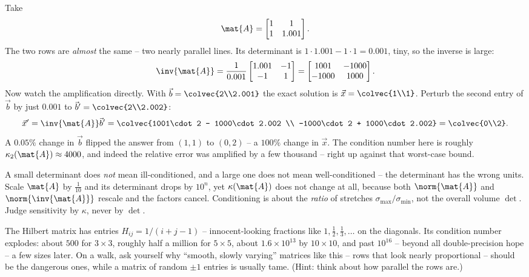 \begin{example}
\label{ch33:cond2x2}
Take
\[
  \mat{A} = \begin{bmatrix} 1 & 1 \\ 1 & 1.001 \end{bmatrix}.
\]
The two rows are \emph{almost} the same -- two nearly parallel lines. Its determinant
is $1\cdot 1.001 - 1\cdot 1 = 0.001$, tiny, so the inverse is large:
\[
  \inv{\mat{A}} = \frac{1}{0.001}\begin{bmatrix} 1.001 & -1 \\ -1 & 1 \end{bmatrix}
   = \begin{bmatrix} 1001 & -1000 \\ -1000 & 1000 \end{bmatrix}.
\]
Now watch the amplification directly. With $\vec{b}=\colvec{2\\2.001}$ the exact
solution is $\vec{x}=\colvec{1\\1}$. Perturb the second entry of $\vec{b}$ by just
$0.001$ to $\vec{b}'=\colvec{2\\2.002}$:
\[
  \vec{x}' = \inv{\mat{A}}\vec{b}' = \colvec{1001\cdot 2 - 1000\cdot 2.002 \\ -1000\cdot 2 + 1000\cdot 2.002}
   = \colvec{0\\2}.
\]
A $0.05\%$ change in $\vec{b}$ flipped the answer from $(1,1)$ to $(0,2)$ -- a $100\%$
change in $\vec{x}$. The condition number here is roughly $\kappa_2(\mat{A})\approx
4000$, and indeed the relative error was amplified by a few thousand -- right up against
that worst-case bound.
\end{example}

\begin{trapbox}
A small determinant does \emph{not} mean ill-conditioned, and a large one does not
mean well-conditioned -- the determinant has the wrong units. Scale $\mat{A}$ by
$\tfrac{1}{10}$ and its determinant drops by $10^{n}$, yet $\kappa(\mat{A})$ does not
change at all, because both $\norm{\mat{A}}$ and $\norm{\inv{\mat{A}}}$ rescale and the
factors cancel. Conditioning is about the \emph{ratio} of stretches
$\sigma_{\max}/\sigma_{\min}$, not the overall volume $\det$. Judge sensitivity by
$\kappa$, never by $\det$.
\end{trapbox}

\begin{walkbox}
The Hilbert matrix has entries $H_{ij}=1/(i+j-1)$ -- innocent-looking fractions like
$1, \tfrac12, \tfrac13,\ldots$ on the diagonals. Its condition number explodes: about
$500$ for $3\times 3$, roughly half a million for $5\times 5$, about $1.6\times 10^{13}$
by $10\times 10$, and past $10^{16}$ -- beyond all double-precision hope -- a few sizes
later. On a walk, ask yourself why ``smooth, slowly varying'' matrices like this -- rows
that look nearly proportional -- should be the dangerous ones, while a matrix of random
$\pm 1$ entries is usually tame. (Hint: think about how parallel the rows are.)
\end{walkbox}

